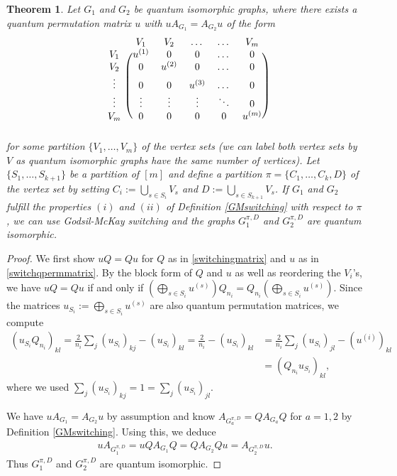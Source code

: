 \documentclass[11pt]{article}
\newtheorem{theo}{Theorem}[section]
\theoremstyle{definition}
\numberwithin{equation}{section}
\begin{document}
\begin{theo}\label{thm:qisoGM}
Let $G_1$ and $G_2$ be quantum isomorphic graphs, where there exists a quantum permutation matrix $u$ with $uA_{G_1}=A_{G_2}u$ of the form
\begin{align}
\begin{blockarray}{cccccc}
&V_1&V_2&\dots&\dots&V_m\\
\begin{block}{c(ccccc)}
V_1&u^{(1)}&0&0&\dots&0\\ V_2&0&u^{(2)}&0&\dots&0\\ \vdots&0&0&u^{(3)}&\dots&0\\\vdots&\vdots &\vdots&\vdots&\ddots&0\\
V_m&0&0&0&0&u^{(m)}\\
\end{block}
\end{blockarray}\label{switchqpermmatrix}
\end{align}
for some partition $\{V_1, \dots, V_m\}$  of the vertex sets (we can label both vertex sets by $V$ as quantum isomorphic graphs have the same number of vertices). Let $\{S_1, \dots, S_{k+1}\}$ be a partition of $[m]$ and define a partition $\pi=\{C_1, \dots, C_k, D\}$ of the vertex set by setting $C_i:=\bigcup_{s\in S_i}V_s$ and $D:=\bigcup_{s\in S_{k+1}}V_s$.
If $G_1$ and $G_2$ fulfill the properties $(i)$ and $(ii)$ of Definition \ref{GMswitching} with respect to $\pi$, we can use Godsil-McKay switching and the graphs $G_1^{\pi, D}$ and $G_2^{\pi, D}$ are quantum isomorphic. 
\end{theo}

\begin{proof}
We first show $uQ=Qu$ for $Q$ as in \eqref{switchingmatrix} and $u$ as in \eqref{switchqpermmatrix}. By the block form of $Q$ and $u$ as well as reordering the $V_i$'s, we have $uQ=Qu$ if and only if $(\bigoplus_{s\in S_i}u^{(s)})Q_{n_i}=Q_{n_i}(\bigoplus_{s\in S_i}u^{(s)})$. Since the matrices $u_{S_i}:=\bigoplus_{s\in S_i}u^{(s)}$ are also quantum permutation matrices, we compute
\begin{align*}
    (u_{S_i}Q_{n_i})_{kl}=\frac{2}{n_i}\sum_j (u_{S_i})_{kj}- (u_{S_i})_{kl}=\frac{2}{n_i}-(u_{S_i})_{kl} &=\frac{2}{n_i}\sum_j (u_{S_i})_{jl}-(u^{(i)})_{kl} \\ &=(Q_{n_i}u_{S_i})_{kl}, 
\end{align*}
where we used $\sum_j (u_{S_i})_{kj}=1=\sum_j (u_{S_i})_{jl}$. 

We have $uA_{G_1}=A_{G_2}u$ by assumption and know $A_{G_a^{\pi, D}}=QA_{G_a}Q$ for $a=1,2$ by Definition \ref{GMswitching}. Using this, we deduce
\begin{align*}
    uA_{G_1^{\pi, D}}=uQA_{G_1}Q=QA_{G_2}Qu=A_{G_2^{\pi, D}}u. 
\end{align*}
Thus $G_1^{\pi, D}$ and $G_2^{\pi, D}$ are quantum isomorphic. 
\end{proof}
\end{document}
